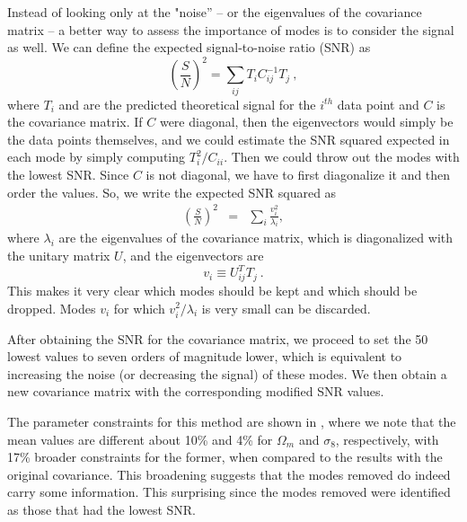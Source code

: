 \documentclass[twocolumn]{\docclass}
\newcommand\be{\begin{equation}}
\newcommand\ee{\end{equation}}
\def\bea{\begin{eqnarray}}
\def\eea{\end{eqnarray}}
\begin{document}
	Instead of looking only at the "noise'' -- or the eigenvalues of the covariance matrix -- a better way to assess the importance of modes is to consider the signal as well. We can define the expected signal-to-noise ratio (SNR) as
	\be
	\left(\frac{S}{N}\right)^2 = \sum_{ij} T_i C^{-1}_{ij} T_j\
	,\ee
	where $T_i$ and are the predicted theoretical signal for the $i^{th}$ data point and $C$ is the covariance matrix. If $C$ were diagonal, then the eigenvectors would simply be the data points themselves, and we could estimate the SNR squared expected in each mode by simply computing $T_i^2/C_{ii}$. Then we could throw out the modes with the lowest SNR. Since $C$ is not diagonal, we have to first diagonalize it and then order the values. So, we write the expected SNR squared as
	\bea
	\left(\frac{S}{N}\right)^2 %
	&=& \sum_{i} \frac{v_i^2}{\lambda_i}
	,\eea
	where $\lambda_i$ are the eigenvalues of the covariance matrix, which is diagonalized with the unitary matrix $U$, and the eigenvectors are 
	\be
	v_i\equiv U_{ij}^T T_j\
	.\ee
	This makes it very clear which modes should be kept and which should be dropped. Modes $v_i$ for which $v_i^2/\lambda_i$ is very small can be discarded. 
	
	After obtaining the SNR for the covariance matrix, we proceed to set the 50 lowest values to seven orders of magnitude lower, which is equivalent to increasing the noise (or decreasing the signal) of these modes. We then obtain a new covariance matrix with the corresponding modified SNR values. 
	
	
	The parameter constraints for this method are shown in , where we note that the mean values are different about 10\% and 4\% for $\Omega_m$ and $\sigma_8$, respectively, with 17\% broader constraints for the former, when compared to the results with the original covariance. This broadening suggests that the modes removed do indeed carry some information. This surprising since the modes removed were identified as those that had the lowest SNR.
\end{document}
